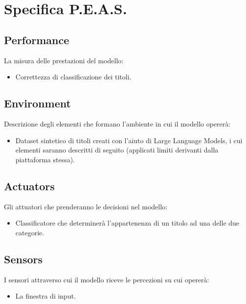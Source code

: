 \documentclass[a4paper,12pt]{report}
\begin{document}
\section{Specifica P.E.A.S.}
\subsection{Performance}
La misura delle prestazioni del modello:
\begin{itemize}
    \item Correttezza di classificazione dei titoli.
\end{itemize}

\subsection{Environment}
Descrizione degli elementi che formano l'ambiente in cui il modello opererà:
\begin{itemize}
    \item Dataset sintetico di titoli creati con l'aiuto di Large Language Models, i cui elementi saranno descritti di seguito (applicati limiti derivanti dalla piattaforma stessa).
\end{itemize}

\subsection{Actuators}
Gli attuatori che prenderanno le decisioni nel modello:
\begin{itemize}
    \item Classificatore che determinerà l'appartenenza di un titolo ad una delle due categorie.
\end{itemize}

\subsection{Sensors}
I sensori attraverso cui il modello riceve le percezioni su cui opererà:
\begin{itemize}
    \item La finestra di input.
\end{itemize}
\end{document}
